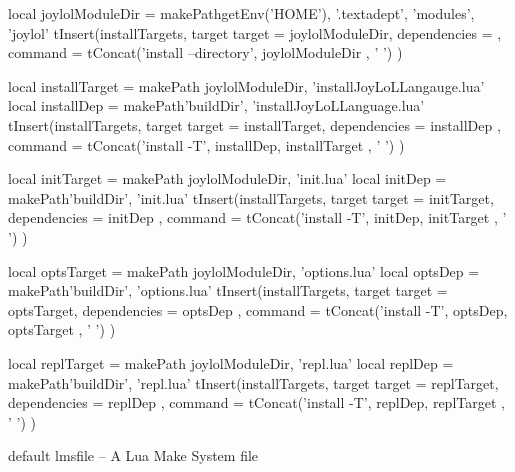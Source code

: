 local joylolModuleDir =
  makePath{getEnv('HOME'), '.textadept', 'modules', 'joylol'}
tInsert(installTargets, target{
  target       = joylolModuleDir,
  dependencies = { },
  command      = tConcat({'install --directory', joylolModuleDir }, ' ')
})

local installTarget =
  makePath{ joylolModuleDir, 'installJoyLoLLangauge.lua'}
local installDep    = makePath{'buildDir', 'installJoyLoLLanguage.lua'}
tInsert(installTargets, target{
  target       = installTarget,
  dependencies = { installDep },
  command      = tConcat({'install -T', installDep, installTarget }, ' ')
})

local initTarget =
  makePath{ joylolModuleDir, 'init.lua'}
local initDep    = makePath{'buildDir', 'init.lua'}
tInsert(installTargets, target{
  target       = initTarget,
  dependencies = { initDep },
  command      = tConcat({'install -T', initDep, initTarget }, ' ')
})

local optsTarget =
  makePath{ joylolModuleDir, 'options.lua'}
local optsDep    = makePath{'buildDir', 'options.lua'}
tInsert(installTargets, target{
  target       = optsTarget,
  dependencies = { optsDep },
  command      = tConcat({'install -T', optsDep, optsTarget }, ' ')
})

local replTarget =
  makePath{ joylolModuleDir, 'repl.lua'}
local replDep    = makePath{'buildDir', 'repl.lua'}
tInsert(installTargets, target{
  target       = replTarget,
  dependencies = { replDep },
  command      = tConcat({'install -T', replDep, replTarget }, ' ')
})
\stopLmsfile



\createLmsfileFile%
  {default}%
  {lmsfile}%
  {-- A Lua Make System file}
